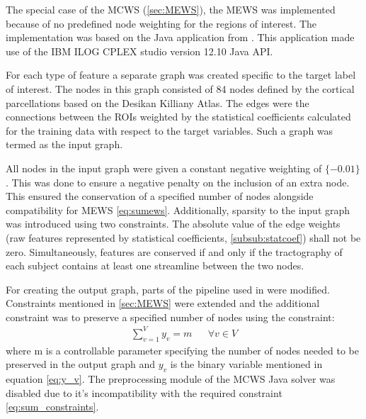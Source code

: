 \documentclass[msthesis.tex]{subfiles}
\begin{document}
The special case of the \gls{MCWS} (\autoref{sec:MEWS}), the \gls{MEWS} was implemented because of no predefined node weighting for the regions of interest. The implementation was based on  the Java application from \cite{DBLP:journals/corr/LobodaAS16}. This application made use of the IBM ILOG CPLEX studio version 12.10 Java \gls{API}. 

For each type of feature a separate graph was created specific to the target label of interest. The nodes in this graph consisted of 84 nodes defined by the cortical parcellations based on the Desikan Killiany Atlas. The edges were the connections between the ROIs weighted by the statistical coefficients calculated for the training data with respect to the target variables. Such a graph was termed as the input graph.

All nodes in the input graph were given a constant negative weighting of $\{-0.01\}$. This was done to ensure a negative penalty on the inclusion of an extra node. This ensured the conservation of a specified number of nodes alongside compatibility for MEWS  \autoref{eq:sumews}. Additionally, sparsity to the input graph was introduced using two constraints. The absolute value of the edge weights (raw features represented by statistical coefficients, \autoref{subsub:statcoef}) shall not be zero. Simultaneously, features are conserved if and only if the tractography of each subject contains at least one streamline between the two nodes. 

For creating the output graph, parts of the pipeline used in \cite{DBLP:journals/corr/LobodaAS16} were modified. Constraints mentioned in \autoref{sec:MEWS} were extended and the additional constraint was to preserve a specified number of nodes using the constraint:
\begin{align}
    \label{eq:sum_constraints}
    \sum_{v=1}^{V} y_v = m        &&  \forall v \in V
\end{align}
where m is a controllable parameter specifying the number of nodes needed to be preserved in the output graph and $y_v$ is the binary variable mentioned in equation \autoref{eq:y_v}. The preprocessing module of the MCWS Java solver was disabled due to it's incompatibility with the required constraint \autoref{eq:sum_constraints}.
\end{document}
